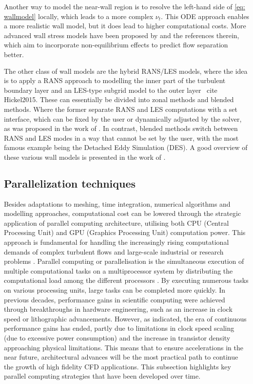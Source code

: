 Another way to model the near-wall region is to resolve the left-hand side of \autoref{eq: wallmodel} locally, which leads to a more complex $\nu_t$. This ODE approach \cite{LARSSON2016} enables a more realistic wall model, but it does lead to higher computational costs. More advanced wall stress models have been proposed by \textcite{Hickel2015} and the references therein, which aim to incorporate non-equilibrium effects to predict flow separation better.

The other class of wall models are the hybrid RANS/LES models, where the idea is to apply a RANS approach to modelling the inner part of the turbulent boundary layer and an LES-type subgrid model to the outer layer \ cite {Hickel2015}. These can essentially be divided into zonal methods and blended methods. Where the former separate RANS and LES computations with a set interface, which can be fixed by the user or dynamically adjusted by the solver, as was proposed in the work of \textcite{Qumr2002}. In contrast, blended methods switch between RANS and LES modes in a way that cannot be set by the user, with the most famous example being the Detached Eddy Simulation (DES). A good overview of these various wall models is presented in the work of \textcite{LARSSON2016}.

\subsection{Parallelization techniques}
Besides adaptations to meshing, time integration, numerical algorithms and modelling approaches, computational cost can be lowered through the strategic application of parallel computing architecture, utilising both CPU (Central Processing Unit) and GPU (Graphics Processing Unit) computation power. This approach is fundamental for handling the increasingly rising computational demands of complex turbulent flows and large-scale industrial or research problems \cite{Driss2018}.
Parallel computing or parallelisation is the simultaneous execution of multiple computational tasks on a multiprocessor system by distributing the computational load among the different processors \cite{Afzal2017}. By executing numerous tasks on various processing units, large tasks can be completed more quickly. In previous decades, performance gains in scientific computing were achieved through breakthroughs in hardware engineering, such as an increase in clock speed or lithographic advancements. However, as \textcite{Shalf2020} indicated, the era of continuous performance gains has ended, partly due to limitations in clock speed scaling (due to excessive power consumption) and the increase in transistor density approaching physical limitations. This means that to ensure accelerations in the near future, architectural advances will be the most practical path to continue the growth of high fidelity CFD applications\cite{Shalf2020}. This subsection highlights key parallel computing strategies that have been developed over time. 


